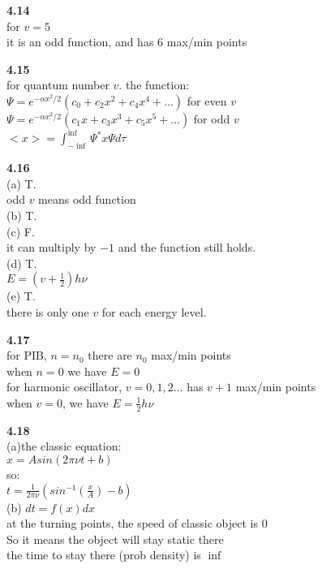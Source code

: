 \documentclass{article}
\begin{document}
\textbf{4.14}\\
for $v = 5$\\
it is an odd function, and has 6 max/min points\\
\newline

\textbf{4.15}\\
for quantum number $v$.
the function:\\
$\Psi = e^{-\alpha x^2 / 2}(c_0+c_2x^2+c_4x^4+\dots)$ for even $v$\\
$\Psi = e^{-\alpha x^2 / 2}(c_1x+c_3x^3+c_5x^5+\dots)$ for odd $v$\\
$<x> = \int_{-\inf}^{\inf}\Psi^*x\Psi d\tau$\\
\newline

\textbf{4.16}\\
(a) T.\\
odd $v$ means odd function\\
(b) T.\\
(c) F.\\
it can multiply by $-1$ and the function still holds.\\
(d) T.\\
$E = (v+\frac{1}{2})h\nu$\\
(e) T.\\
there is only one $v$ for each energy level.\\
\newline

\textbf{4.17}\\
for PIB, $n=n_0$ there are $n_0$ max/min points\\
when $n = 0$ we have $E = 0$\\
for harmonic oscillator, $v = 0,1,2\dots$ has $v+1$ max/min points\\
when $v = 0$, we have $E = \frac{1}{2}h\nu$\\
\newline

\textbf{4.18}\\
(a)the classic equation:\\
$x = Asin(2\pi\nu t + b)$\\
so:\\
$t = \frac{1}{2\pi\nu}(sin^{-1}(\frac{x}{A}) - b)$\\
(b) $dt = f(x)dx$\\
at the turning points, the speed of classic object is $0$\\
So it means the object will stay static there\\
the time to stay there (prob density) is $\inf$\\
\newline
\end{document}
